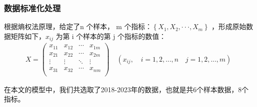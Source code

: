 \subsubsection{数据标准化处理}
根据熵权法原理，给定了n 个样本， m 个指标：$\left\{ X_{1},X_{2},\cdot\cdot\cdot,X_{m}\right\}$ ，形成原始数据矩阵如下，$x_{ij}$ 为第 i 个样本的第 j 个指标的数值：
\begin{equation}
\begin{aligned}
X=\begin{pmatrix} x_{11} & x_{12} & \cdots & x_{1m} \\ x_{21} & x_{22} & \cdots & x_{2m} \\ \vdots & \vdots & \ddots & \vdots \\ x_{31}& x_{32} & \cdots &x_{nm} \\ \end{pmatrix}\quad (x_{ij},\quad i=1,2,...,n\quad j=1,2,...,m)
  \label{eq:matrix-x}
\end{aligned}
\end{equation}

在本文的模型中，我们共选取了2018-2023年的数据，也就是共6个样本数据，8个指标。

